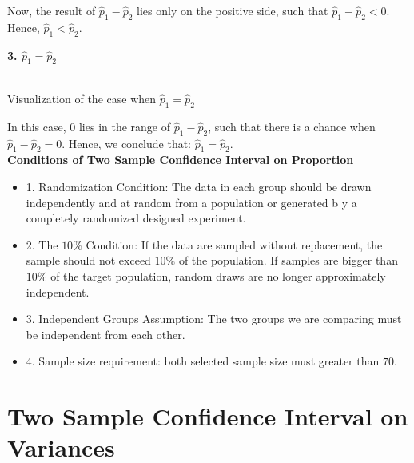 Now, the result of $\hat{p}_1 - \hat{p}_2$ lies only on the positive side, such that $\hat{p}_1 - \hat{p}_2 < 0$. Hence, $\hat{p}_1 < \hat{p}_2$.

\textbf{3. $\hat{p}_1 = \hat{p}_2$}

\begin{center}
\vspace{0.5em}
\small\textbf{}\\Visualization of the case when $\hat{p}_1 = \hat{p}_2$
\end{center}

In this case, $0$ lies in the range of $\hat{p}_1 - \hat{p}_2$, such that there is a chance when $\hat{p}_1 - \hat{p}_2 = 0$. Hence, we conclude that: $\hat{p}_1 = \hat{p}_2$.\\

\textbf{Conditions of Two Sample Confidence Interval on Proportion}

\begin{itemize}
	\item 1. Randomization Condition: The data in each group should be drawn independently and at random from a population or generated b y a completely randomized designed experiment.
	\item 2. The $10\%$ Condition: If the data are sampled without replacement, the sample should not exceed $10\%$ of the population. If samples are bigger than $10\%$ of the target population, random draws are no longer approximately independent.
	\item 3. Independent Groups Assumption: The two groups we are comparing must be independent from each other.
	\item 4. Sample size requirement: both selected sample size must greater than $70$.
\end{itemize}

\section{Two Sample Confidence Interval on Variances}

